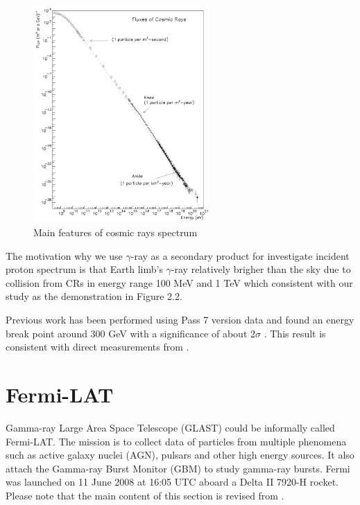 \begin{figure}[h!]
\centering
  \includegraphics[width=0.6\textwidth]{img/Swordy}
  \caption{Main features of cosmic rays spectrum}
\end{figure}

\par The motivation why we use $\gamma$-ray as a secondary product for investigate incident proton spectrum is that Earth limb's $\gamma$-ray relatively brigher than the sky due to collision from CRs in energy range 100 MeV and 1 TeV which consistent with our study \cite{Warit2009} as the demonstration in Figure 2.2.

\par Previous work has been performed using Pass 7 version data \cite{FermiPass7} and found an energy break point around 300 GeV with a significance of about 2$\sigma$ \cite{previouswork}. This result is consistent with direct measurements from \cite{AMS-02,PAMELA}.


\newpage
\section{\acl{Fermi-LAT} }
Gamma-ray Large Area Space Telescope (GLAST) could be informally called \acf{Fermi-LAT}. The mission is to collect data of particles from multiple phenomena such as active galaxy nuclei (AGN), pulsars and other high energy sources.
It also attach the Gamma-ray Burst Monitor (GBM) to study gamma-ray bursts. Fermi was launched on 11 June 2008 at 16:05 UTC aboard a Delta II 7920-H rocket. Please note that the main content of this section is revised from \cite{FermiStructure}.

